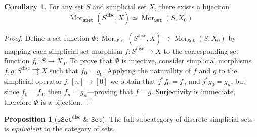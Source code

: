 \documentclass[11pt, reqno]{amsart}
\theoremstyle{definition}
\newtheorem{proposition}[theorem]{Proposition}
\newtheorem{corollary}[theorem]{Corollary}
\newcommand{\iso}{\simeq}
\newcommand{\para}{\rightrightarrows}
\newcommand{\N}{\mathbf{N}}
\newcommand{\catfont}{\texttt}
\newcommand{\Set}{{\catfont{Set}}}          %
\DeclareMathOperator{\Hom}{Mor}   %
\DeclareMathOperator{\Mor}{Mor}   %
\newcommand{\sSet}{{\catfont{sSet}}}            %
\newcommand{\disc}{\text{disc}}   %
\begin{document}
\begin{corollary}
\label{cor:bijection-discrete-simplicial-set-and-set-functions}
For any set \(S\) and simplicial set \(X\), there exists a bijection
\[
\Hom_{\sSet}(S^{\disc}, X) \iso \Hom_{\Set}(S, X_0).
\]
\end{corollary}

\begin{proof}
Define a set-function
\(\Phi: \Hom_{\sSet}(S^{\disc}, X) \to \Hom_{\Set}(S, X_0)\) by mapping each
simplicial set morphism \(f: S^{\disc} \to X\) to the corresponding set function
\(f_0: S \to X_0\). To prove that \(\Phi\) is injective, consider simplicial
morphisms \(f, g: S^{\disc} \para X\) such that \(f_0 = g_0\). Applying the
naturallity of \(f\) and \(g\) to the simplicial operator \(j: [n] \to [0]\) we
obtain that \(j^{*} f_0 = f_n\) and \(j^{*} g_0 = g_n\), but since
\(f_0 = f_0\), then \(f_n = g_n\)---proving that \(f = g\). Surjectivity is
immediate, therefore \(\Phi\) is a bijection.
\end{proof}

\begin{proposition}[\(\sSet^{\disc}\) \& \(\Set\)]
\label{prop:sSet-disc-equivalent-to-Set}
The full subcategory of discrete simplicial sets is \emph{equivalent} to the
category of sets.
\end{proposition}


\end{document}
